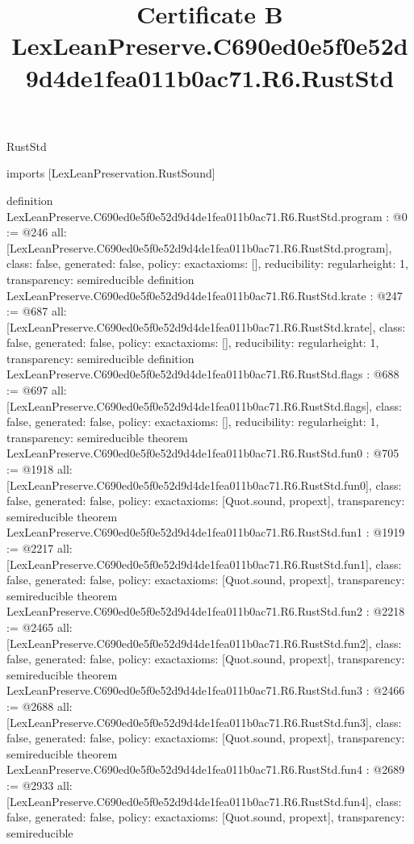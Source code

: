 \begin{lexlean}{RustStd}
\title{Certificate B LexLeanPreserve.C690ed0e5f0e52d9d4de1fea011b0ac71.R6.RustStd}
\begin{coremodule}
imports [LexLeanPreservation.RustSound]

definition LexLeanPreserve.C690ed0e5f0e52d9d4de1fea011b0ac71.R6.RustStd.program : @0 := @246 {
  all: [LexLeanPreserve.C690ed0e5f0e52d9d4de1fea011b0ac71.R6.RustStd.program],
  class: false,
  generated: false,
  policy: exact{axioms: []},
  reducibility: regular{height: 1},
  transparency: semireducible
}
definition LexLeanPreserve.C690ed0e5f0e52d9d4de1fea011b0ac71.R6.RustStd.krate : @247 := @687 {
  all: [LexLeanPreserve.C690ed0e5f0e52d9d4de1fea011b0ac71.R6.RustStd.krate],
  class: false,
  generated: false,
  policy: exact{axioms: []},
  reducibility: regular{height: 1},
  transparency: semireducible
}
definition LexLeanPreserve.C690ed0e5f0e52d9d4de1fea011b0ac71.R6.RustStd.flags : @688 := @697 {
  all: [LexLeanPreserve.C690ed0e5f0e52d9d4de1fea011b0ac71.R6.RustStd.flags],
  class: false,
  generated: false,
  policy: exact{axioms: []},
  reducibility: regular{height: 1},
  transparency: semireducible
}
theorem LexLeanPreserve.C690ed0e5f0e52d9d4de1fea011b0ac71.R6.RustStd.fun0 : @705 := @1918 {
  all: [LexLeanPreserve.C690ed0e5f0e52d9d4de1fea011b0ac71.R6.RustStd.fun0],
  class: false,
  generated: false,
  policy: exact{axioms: [Quot.sound, propext]},
  transparency: semireducible
}
theorem LexLeanPreserve.C690ed0e5f0e52d9d4de1fea011b0ac71.R6.RustStd.fun1 : @1919 := @2217 {
  all: [LexLeanPreserve.C690ed0e5f0e52d9d4de1fea011b0ac71.R6.RustStd.fun1],
  class: false,
  generated: false,
  policy: exact{axioms: [Quot.sound, propext]},
  transparency: semireducible
}
theorem LexLeanPreserve.C690ed0e5f0e52d9d4de1fea011b0ac71.R6.RustStd.fun2 : @2218 := @2465 {
  all: [LexLeanPreserve.C690ed0e5f0e52d9d4de1fea011b0ac71.R6.RustStd.fun2],
  class: false,
  generated: false,
  policy: exact{axioms: [Quot.sound, propext]},
  transparency: semireducible
}
theorem LexLeanPreserve.C690ed0e5f0e52d9d4de1fea011b0ac71.R6.RustStd.fun3 : @2466 := @2688 {
  all: [LexLeanPreserve.C690ed0e5f0e52d9d4de1fea011b0ac71.R6.RustStd.fun3],
  class: false,
  generated: false,
  policy: exact{axioms: [Quot.sound, propext]},
  transparency: semireducible
}
theorem LexLeanPreserve.C690ed0e5f0e52d9d4de1fea011b0ac71.R6.RustStd.fun4 : @2689 := @2933 {
  all: [LexLeanPreserve.C690ed0e5f0e52d9d4de1fea011b0ac71.R6.RustStd.fun4],
  class: false,
  generated: false,
  policy: exact{axioms: [Quot.sound, propext]},
  transparency: semireducible
}
\end{coremodule}
\end{lexlean}
